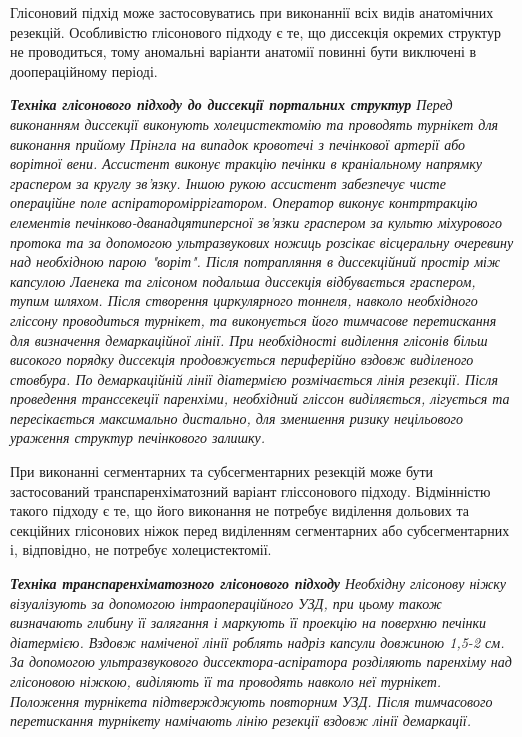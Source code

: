 \begin{refsection}
Глісоновий підхід може застосовуватись при виконаннії всіх видів анатомічних резекцій. Особливістю глісонового підходу є те, що диссекція окремих структур не проводиться, тому аномальні варіанти анатомії повинні бути виключені в доопераційному періоді.

\textit{ \textbf{Техніка глісонового підходу до диссекції портальних структур} Перед виконанням диссекції виконують холецистектомію та проводять турнікет для виконання прийому Прінгла на випадок кровотечі з печінкової артерії або ворітної вени. Ассистент виконує тракцію печінки в краніальному напрямку граспером за круглу зв'язку. Іншою рукою ассистент забезпечує чисте операційне поле аспіратором\-іррігатором. Оператор виконує контртракцію елементів печінково-\-дванадцятиперсної зв'язки граспером за культю міхурового протока та за допомогою ультразвукових ножиць розсікає вісцеральну очеревину над необхідною парою "воріт". Після потрапляння в диссекційний простір між капсулою Лаенека та глісоном подальша диссекція відбувається граспером, тупим шляхом. Після створення  циркулярного тоннеля, навколо необхідного гліссону проводиться турнікет, та виконується його тимчасове перетискання для визначення демаркаційної лінії. При необхідності виділення глісонів більш високого порядку диссекція продовжується периферійно вздовж виділеного стовбура. По демаркаційній лінії діатермією розмічається лінія резекції. Після проведення транссекеції паренхіми, необхідний гліссон виділяється, лігується та пересікається максимально дистально, для зменшення ризику нецільового ураження структур печінкового залишку.}

При виконанні сегментарних та субсегментарних резекцій може бути застосований транспаренхіматозний варіант гліссонового підходу. Відмінністю такого підходу є те, що його виконання не потребує виділення дольових та секційних глісонових ніжок перед виділенням сегментарних або субсегментарних і, відповідно, не потребує холецистектомії.

\textit{ \textbf{Техніка транспаренхіматозного глісонового підходу} Необхідну глісонову ніжку візуалізують за допомогою інтраопераційного УЗД, при цьому також визначають глибину її залягання і маркують її проекцію на поверхню печінки діатермією. Вздовж наміченої лінії роблять надріз капсули довжиною 1,5-2 см. За допомогою ультразвукового диссектора-аспіратора розділяють паренхіму над глісоновою ніжкою, виділяють її та проводять навколо неї турнікет. Положення турнікета підтвержджують повторним УЗД. Після тимчасового перетискання турнікету намічають лінію резекції вздовж лінії демаркації.}


\end{refsection}
